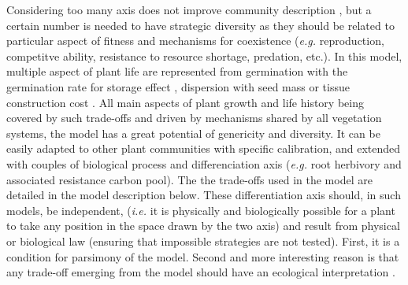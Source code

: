 Considering too many axis does not improve community description \cite{laughlin_intrinsic_2014}, but a certain number is needed to have strategic diversity as they should be related to particular aspect of fitness and mechanisms for coexistence (\textit{e.g.} reproduction, competitve ability, resistance to resource shortage, predation, etc.). In this model, multiple aspect of plant life are represented from germination with the germination rate for storage effect \cite{chesson_general_2000, adler_climate_2006}, dispersion with seed mass \cite{westoby_leaf-height-seed_1998} or tissue construction cost \cite{reich_leaf_1992, wright_worldwide_2004, reich_world-wide_2014}. All main aspects of plant growth and life history being covered by such trade-offs and driven by mechanisms shared by all vegetation systems, the model has a great potential of genericity and diversity. It can be easily adapted to other plant communities with specific calibration, and extended with couples of biological process and differenciation axis (\textit{e.g.} root herbivory and associated resistance carbon pool). The the trade-offs used in the model are detailed in the model description below. These differentiation axis should, in such models, be independent, (\textit{i.e.} it is physically and biologically possible for a plant to take any position in the space drawn by the two axis) and result from physical or biological law (ensuring that impossible strategies are not tested). First, it is a condition for parsimony of the model. Second and more interesting reason is that any trade-off emerging from the model should have an ecological interpretation \cite{maire_disentangling_2013}. \\
 

